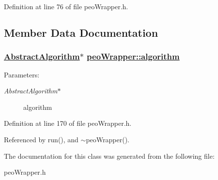 Definition at line 76 of file peo\-Wrapper.h.

\subsection{Member Data Documentation}
\hypertarget{classpeoWrapper_d191ac6d451db7aca86fed473b711346}{
\subsubsection[algorithm]{\setlength{\rightskip}{0pt plus 5cm}\hyperlink{structpeoWrapper_1_1AbstractAlgorithm}{Abstract\-Algorithm}$\ast$ \hyperlink{classpeoWrapper_d191ac6d451db7aca86fed473b711346}{peo\-Wrapper::algorithm}}}
\label{classpeoWrapper_d191ac6d451db7aca86fed473b711346}


\begin{Desc}
\item[Parameters:]
\begin{description}
\item[{\em Abstract\-Algorithm$\ast$}]algorithm \end{description}
\end{Desc}


Definition at line 170 of file peo\-Wrapper.h.

Referenced by run(), and $\sim$peo\-Wrapper().

The documentation for this class was generated from the following file:\begin{CompactItemize}
\item 
peo\-Wrapper.h\end{CompactItemize}
